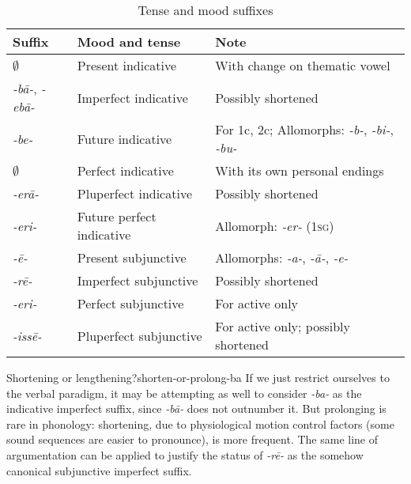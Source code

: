 \documentclass[a4paper, oneside, 12pt]{report}
\newcommand{\form}[1]{\emph{#1}}
\newcommand*{\category}[1]{\textsc{#1}}
\begin{document}
\begin{table}[H]
    \caption{Tense and mood suffixes}
    \label{tbl:tense-suffix}
    \centering
    \begin{tabular}{lll}
        \toprule
        Suffix & Mood and tense & Note \\
        \midrule
        $\emptyset$         & Present indicative        & With change on thematic vowel\\
        \form{-b\={a}-}, \form{-eb\={a}-}    & Imperfect indicative      & Possibly shortened \\
        \form{-be-}         & Future indicative         & For 1c, 2c; 
        Allomorphs: \form{-b-}, \form{-bi-}, \form{-bu-} \\
        \midrule
        $\emptyset$         & Perfect indicative        & With its own personal endings \\ 
        \form{-er\={a}-}    & Pluperfect indicative     & Possibly shortened \\
        \form{-eri-}        & Future perfect indicative & Allomorph: \form{-er-} (\category{1sg}) \\ 
        \midrule
        \form{-\={e}-}      & Present subjunctive       & Allomorphs: \form{-a-}, \form{-\={a}-},
        \form{-e-} \\ 
        \form{-r\={e}-}     & Imperfect subjunctive     & Possibly shortened \\
        \midrule
        \form{-eri-}        & Perfect subjunctive       & For active only \\
        \form{-iss\={e}-}   & Pluperfect subjunctive    & For active only; possibly shortened  \\ \bottomrule
        \end{tabular}
\end{table}

\begin{infobox}{Shortening or lengthening?}{shorten-or-prolong-ba}
    If we just restrict ourselves to the verbal paradigm, 
    it may be attempting as well to consider \form{-ba-} as 
    the indicative imperfect suffix,
    since \form{-b\={a}-} does not outnumber it.
    But prolonging is rare in phonology:
    shortening, due to physiological motion control factors
    (some sound sequences are easier to pronounce), 
    is more frequent.
    The same line of argumentation can be applied to justify the status of \form{-r\={e}-}
    as the somehow canonical subjunctive imperfect suffix.
\end{infobox}
\end{document}
